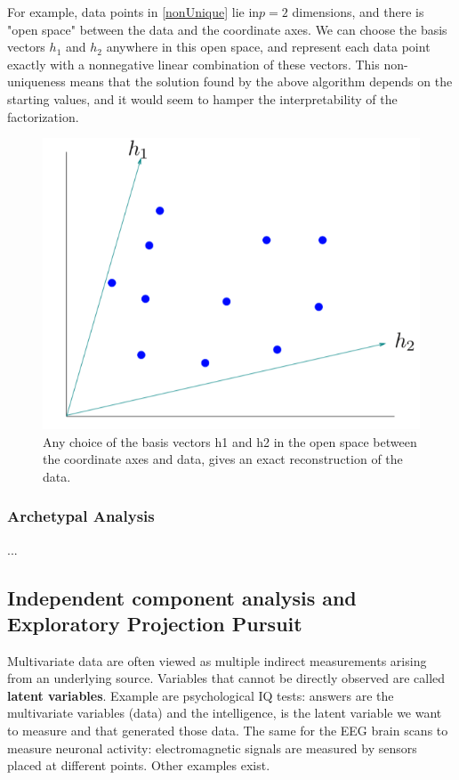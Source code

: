 \documentclass[12pt, letterpaper]{article}
\theoremstyle{definition}
\begin{document}
For example, data points in \autoref{nonUnique} lie in$ p = 2$ dimensions, and there is "open space" between the data and the coordinate axes. We can choose the basis vectors $h_1$ and $h_2$ anywhere in this open space, and represent each data point exactly with a nonnegative linear combination of these vectors. This non-uniqueness means that the solution found by the above algorithm depends on the starting values, and it would seem to hamper the interpretability of the factorization.
\begin{figure}
\centering
\includegraphics[scale=0.4]{img/NonUniqueness}
\caption{Any choice of the basis vectors h1 and h2 in the open space between the coordinate axes and data, gives an exact reconstruction of the data.}
\label{nonUnique}
\end{figure}

\subsubsection{Archetypal Analysis}
...

\subsection{Independent component analysis and Exploratory Projection Pursuit}
Multivariate data are often viewed as multiple indirect measurements arising from an underlying source. Variables that cannot be directly observed are called \textbf{latent variables}. Example are psychological IQ tests: answers are the multivariate variables (data) and the intelligence, is the latent variable we want to measure and that generated those data. The same for the EEG brain scans to measure neuronal activity: electromagnetic signals are measured by sensors placed at different points. Other examples exist.
\end{document}
